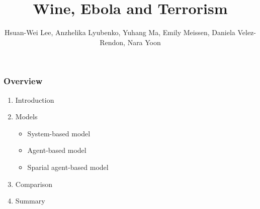 \documentclass[30pt]{beamer}
\author{ Hsuan-Wei Lee,
  Anzhelika Lyubenko,
  Yuhang Ma,
  Emily Meissen,
  Daniela Velez-Rendon,
    Nara Yoon}
\title[]{Wine, Ebola and Terrorism}
\begin{document}
\begin{frame}[t,plain]
    \titlepage
\end{frame}

\begin{frame}[t,plain]
    \frametitle{Overview}
\begin{enumerate}
\vfill
\item Introduction
\item Models
\begin{itemize}
\item System-based model
\item Agent-based model
\item Sparial agent-based model
\end{itemize}
\item Comparison
\item Summary
\end{enumerate}
\end{frame}
\end{document}
